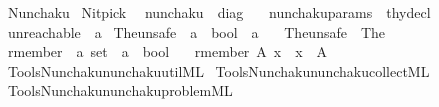 %
\begin{isabellebody}%
%
%
\isadelimtheory
\isanewline
\isanewline
%
\endisadelimtheory
%
\isatagtheory
{}\isamarkupfalse%
\ Nunchaku\isanewline
{}\ Nitpick\isanewline
{}\isanewline
\ \ {\isachardoublequoteopen}nunchaku{\isachardoublequoteclose}\ {\isacharcolon}{\kern0pt}{\isacharcolon}{\kern0pt}\ diag\ \isanewline
\ \ {\isachardoublequoteopen}nunchaku{\isacharunderscore}{\kern0pt}params{\isachardoublequoteclose}\ {\isacharcolon}{\kern0pt}{\isacharcolon}{\kern0pt}\ thy{\isacharunderscore}{\kern0pt}decl\isanewline
{}%
\endisatagtheory
{\isafoldtheory}%
%
\isadelimtheory
\isanewline
%
\endisadelimtheory
\isanewline
{}\isamarkupfalse%
\ unreachable\ {\isacharcolon}{\kern0pt}{\isacharcolon}{\kern0pt}\ {\isacharprime}{\kern0pt}a\isanewline
\isanewline
{}\isamarkupfalse%
\ The{\isacharunderscore}{\kern0pt}unsafe\ {\isacharcolon}{\kern0pt}{\isacharcolon}{\kern0pt}\ {\isachardoublequoteopen}{\isacharparenleft}{\kern0pt}{\isacharprime}{\kern0pt}a\ {\isasymRightarrow}\ bool{\isacharparenright}{\kern0pt}\ {\isasymRightarrow}\ {\isacharprime}{\kern0pt}a{\isachardoublequoteclose}\ \isanewline
\ \ {\isachardoublequoteopen}The{\isacharunderscore}{\kern0pt}unsafe\ {\isacharequal}{\kern0pt}\ The{\isachardoublequoteclose}\isanewline
\isanewline
{}\isamarkupfalse%
\ rmember\ {\isacharcolon}{\kern0pt}{\isacharcolon}{\kern0pt}\ {\isachardoublequoteopen}{\isacharprime}{\kern0pt}a\ set\ {\isasymRightarrow}\ {\isacharprime}{\kern0pt}a\ {\isasymRightarrow}\ bool{\isachardoublequoteclose}\ \isanewline
\ \ {\isachardoublequoteopen}rmember\ A\ x\ {\isasymlongleftrightarrow}\ x\ {\isasymin}\ A{\isachardoublequoteclose}\isanewline
%
\isadelimML
\isanewline
%
\endisadelimML
%
\isatagML
{}\isamarkupfalse%
\ {\isacartoucheopen}Tools{\isacharslash}{\kern0pt}Nunchaku{\isacharslash}{\kern0pt}nunchaku{\isacharunderscore}{\kern0pt}util{\isachardot}{\kern0pt}ML{\isacartoucheclose}\isanewline
{}\isamarkupfalse%
\ {\isacartoucheopen}Tools{\isacharslash}{\kern0pt}Nunchaku{\isacharslash}{\kern0pt}nunchaku{\isacharunderscore}{\kern0pt}collect{\isachardot}{\kern0pt}ML{\isacartoucheclose}\isanewline
{}\isamarkupfalse%
\ {\isacartoucheopen}Tools{\isacharslash}{\kern0pt}Nunchaku{\isacharslash}{\kern0pt}nunchaku{\isacharunderscore}{\kern0pt}problem{\isachardot}{\kern0pt}ML{\isacartoucheclose}\isanewline

\end{isabellebody}
